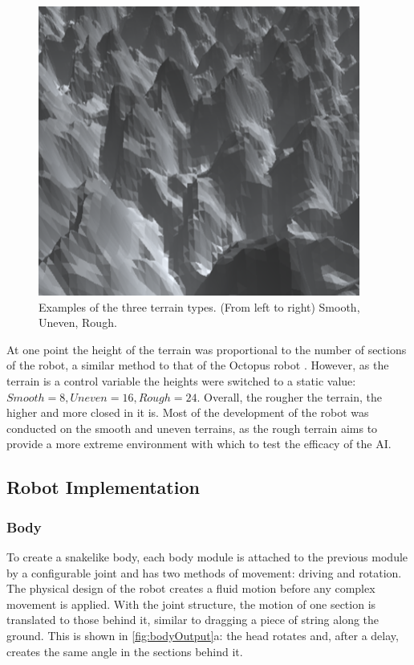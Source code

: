 \documentclass{article}
\begin{document}
\begin{figure}[H]
\includegraphics[scale=0.3]{roughTerrain}
\caption{Examples of the three terrain types. (From left to right) Smooth, Uneven, Rough.}
\end{figure}

At one point the height of the terrain was proportional to the number of sections of the robot, a similar method to that of the Octopus robot . However, as the terrain is a control variable the heights were switched to a static value: $Smooth=8, Uneven=16, Rough=24$. Overall, the rougher the terrain, the higher and more closed in it is. Most of the development of the robot was conducted on the smooth and uneven terrains, as the rough terrain aims to provide a more extreme environment with which to test the efficacy of the AI.\\


\subsection{Robot Implementation}
\label{sec:Robot Imp}
\subsubsection{Body}
\label{sec:Body Imp}
To create a snakelike body, each body module is attached to the previous module by a configurable joint  and has two methods of movement: driving and rotation. The physical design of the robot creates a fluid motion before any complex movement is applied. With the joint structure, the motion of one section is translated to those behind it, similar to dragging a piece of string along the ground. This is shown in \autoref{fig:bodyOutput}a: the head rotates and, after a delay, creates the same angle in the sections behind it.\\
\end{document}
